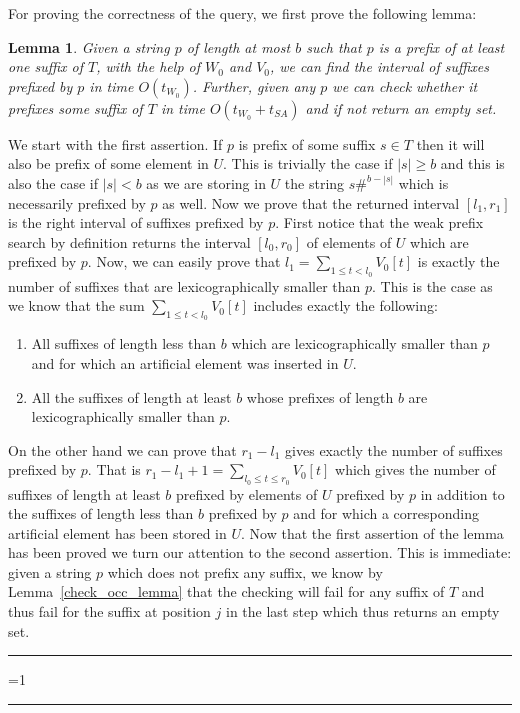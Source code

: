 \documentclass{article}
\newcommand{\?}{\mskip1.5mu}
\newtheorem{lemma}{Lemma}
\newcounter{noqed}
\newcommand{\qed}{ \ifmmode\mbox{
}\fi\rule[-.05em]{.3em}{.7em}\setcounter{noqed}{0}}
\newenvironment{proof}[1][{}]{\noindent{\bf Proof#1.
}\setcounter{noqed}{1}}{\ifnum\value{noqed}=1\qed\fi\par\medskip}
\begin{document}
For proving the correctness of the query, we first prove the following lemma:
\begin{lemma}
Given a string $p$ of length at most $b$ such that $p$ is a prefix of at least one suffix of $T$, with the help of $W_0$ and $V_0$, we can find the interval of suffixes prefixed by $p$ in time  $O(t_{W_0})$. Further, given any $p$ we can check whether it prefixes some suffix of $T$ in time $O(t_{W_0}+t_{SA})$ and if not return an empty set. 
\end{lemma}
\begin{proof}
We start with the first assertion. If $p$ is prefix of some suffix $s\in T$ then it will also be prefix of some element in $U$. This is trivially the case if $|s|\geq b$ and this is also the case if $|s|<b$ as we are storing in $U$ the string $s\#^{b-|s|}$ which is necessarily prefixed by $p$ as well. Now we prove that the returned interval $[l_1,r_1]$ is the right interval of suffixes prefixed by $p$. First notice that the weak prefix search by definition returns the interval $[l_0,r_0]$ of elements of $U$ which are prefixed by $p$. Now, we can easily prove that $l_1=\sum_{1\leq t<l_0}V_0[t]$ is exactly the number of suffixes that are lexicographically smaller than $p$. This is the case as we know that the sum $\sum_{1\leq t<l_0}V_0[t]$ includes exactly the following:
\begin{enumerate}
\item All suffixes of length less than $b$ which are lexicographically smaller than $p$ and for which an artificial element was inserted in $U$. 
\item All the suffixes of length at least $b$ whose prefixes of length $b$ are lexicographically smaller than $p$. 
\end{enumerate}
On the other hand we can prove that $r_1-l_1$ gives exactly the number of suffixes prefixed by $p$. That is $r_1-l_1+1=\sum_{l_0\leq t\leq r_0}V_0[t]$ which gives the number of suffixes of length at least $b$ prefixed by elements of $U$ prefixed by $p$ in addition to the suffixes of length less than $b$ prefixed by $p$ and for which a corresponding artificial element has been stored in $U$. Now that the first assertion of the lemma has been proved we turn our attention to the second assertion. This is immediate: given a string $p$ which does not prefix any suffix, we know by Lemma~\ref{check_occ_lemma} that the checking will fail for any suffix of $T$ and thus fail for the suffix at position $j$ in the last step which thus returns an empty set. 
\qed
\end{proof}
\end{document}
